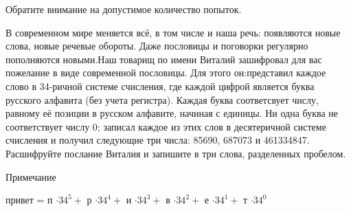 
Обратите внимание на допустимое количество попыток.

В современном мире меняется всё, в том числе и наша речь: появляются новые слова, новые речевые обороты. 
Даже пословицы и поговорки регулярно пополняются новыми.Наш товарищ по имени Виталий зашифровал для вас 
пожелание в виде современной пословицы. Для этого он:представил каждое слово в 34-ричной системе счисления, 
где каждой цифрой является буква русского алфавита (без учета регистра). 
Каждая буква соответсвует числу, равному её позиции в русском алфавите, начиная с единицы. 
Ни одна буква не соответствует числу 0; записал каждое из этих слов в десятеричной системе 
счисления и получил следующие три числа: 85690, 687073 и 461334847. Расшифруйте послание Виталия и 
запишите в три слова, разделенных пробелом.

Примечание

привет = п $\cdot 34^5 +$ р $\cdot 34^4 +$ и $\cdot 34^3 +$ в $\cdot 34^2 +$ е $\cdot 34^1 +$ т $\cdot 34^0$ 

\soultionSection

